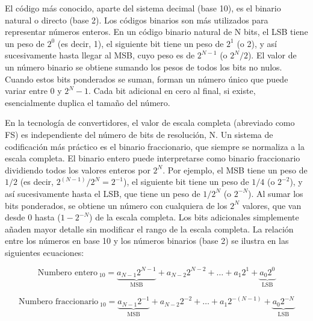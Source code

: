     El código más conocido, aparte del sistema decimal (base 10), es el binario natural o directo (base 2). Los códigos binarios son más utilizados para representar números enteros. En un código binario natural de N bits, el LSB tiene un peso de $2^{0}$ (es decir, 1), el siguiente bit tiene un peso de $2^{1}$ (o 2), y así sucesivamente hasta llegar al MSB, cuyo peso es de $2^{N-1}$ (o $2^{N} / 2$). El valor de un número binario se obtiene sumando los pesos de todos los bits no nulos. Cuando estos bits ponderados se suman, forman un número único que puede variar entre 0 y $2^{N} -1$. Cada bit adicional en cero al final, si existe, esencialmente duplica el tamaño del número.

    En la tecnología de convertidores, el valor de escala completa (abreviado como FS) es independiente del número de bits de resolución, N. Un sistema de codificación más práctico es el binario fraccionario, que siempre se normaliza a la escala completa. El binario entero puede interpretarse como binario fraccionario dividiendo todos los valores enteros por $2^{N}$. Por ejemplo, el MSB tiene un peso de $1/2$ (es decir, $2^{(N-1)}/2^{N}= 2^{-1}$), el siguiente bit tiene un peso de $1/4$ (o $2^{-2}$), y así sucesivamente hasta el LSB, que tiene un peso de $1/2^{N}$ (o $2^{-N}$). Al sumar los bits ponderados, se obtiene un número con cualquiera de los $2^{N}$ valores, que van desde 0 hasta ($1 - 2^{-N}$) de la escala completa. Los bits adicionales simplemente añaden mayor detalle sin modificar el rango de la escala completa. La relación entre los números en base 10 y los números binarios (base 2) se ilustra en las siguientes ecuaciones:

    \begin{equation}
      \text{Numbero entero}_{\;10} = \underbrace{a_{N-1} 2^{N-1}}_{\text{MSB}}  + a_{N-2} 2^{N-2} + \ldots + a_{1} 2^{1} + \underbrace{a_{0} 2^{0}}_{\text{LSB}} 
    \end{equation}

    \begin{equation}
      \text{Numbero fraccionario}_{\;10} = \underbrace{a_{N-1} 2^{-1}}_{\text{MSB}}  + a_{N-2} 2^{-2} + \ldots + a_{1} 2^{-(N-1)} + \underbrace{a_{0} 2^{-N}}_{\text{LSB}} 
    \end{equation}

